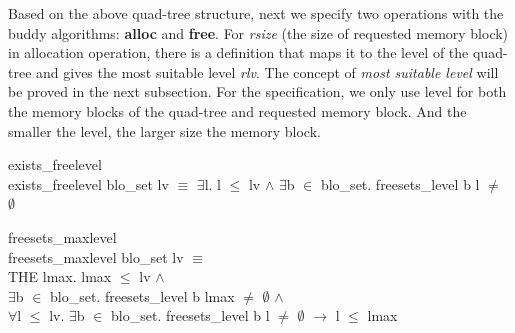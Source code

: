 \documentclass[runningheads]{llncs}
\begin{document}
Based on the above quad-tree structure, next we specify two operations with the buddy algorithms: \textbf{alloc} and \textbf{free}. For \textsl{rsize} (the size of requested memory block) in allocation operation, there is a definition that maps it to the level of the quad-tree and gives the most suitable level \textsl{rlv}. The concept of \textsl{most suitable level} will be proved in the next subsection. For the specification, we only use level for both the memory blocks of the quad-tree and requested memory block. And the smaller the level, the larger size the memory block.

\begin{definition} {exists\_freelevel} \\
exists\_freelevel blo\_set lv $\equiv$ $\exists$l. l $\leq$ lv $\wedge$ $\exists$b $\in$ blo\_set. freesets\_level b l $\ne$ $\emptyset$
\end{definition}

\begin{definition} {freesets\_maxlevel}\\
freesets\_maxlevel blo\_set lv $\equiv$ \\
\phantom{x} \hspace{10pt} THE lmax. lmax $\leq$ lv $\wedge$ \\
\phantom{x} \hspace{60pt} $\exists$b $\in$ blo\_set. freesets\_level b lmax $\neq$ $\emptyset$ $\wedge$ \\
\phantom{x} \hspace{60pt} $\forall$l $\leq$ lv. $\exists$b $\in$ blo\_set. freesets\_level b l $\ne$ $\emptyset$ $\longrightarrow$ l $\leq$ lmax
\end{definition}
\end{document}
